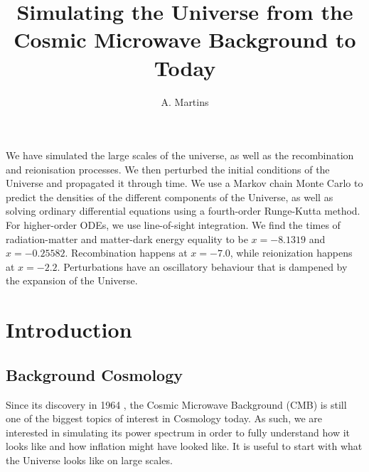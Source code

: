\documentclass{aa}
\begin{document}
 


   \title{Simulating the Universe from the Cosmic Microwave Background to Today}

   \subtitle{}

   \author{A. Martins
          }


   \date{}

 
  \abstract
   {}
   {We have simulated the large scales of the universe, as well as the recombination and reionisation processes. We then perturbed the initial conditions of the Universe and propagated it through time.}
   {We use a Markov chain Monte Carlo to predict the densities of the different components of the Universe, as well as solving ordinary differential equations using a fourth-order Runge-Kutta method. For higher-order ODEs, we use line-of-sight integration.}
   {We find the times of radiation-matter and matter-dark energy equality to be $x=-8.1319$ and $x=-0.25582$. Recombination happens at $x=-7.0$, while reionization happens at $x=-2.2$. Perturbations have an oscillatory behaviour that is dampened by the expansion of the Universe.}
   {}


   \maketitle
%

\section{Introduction}

\subsection{Background Cosmology}
Since its discovery in 1964 \citep{1965ApJ...142..419P, 1965ApJ...142..414D}, the Cosmic Microwave Background (CMB) is still one of the biggest topics of interest in Cosmology today.
As such, we are interested in simulating its power spectrum in order to fully understand how it looks like and how inflation might have looked like. It is useful to start with what the Universe looks like on large scales.
\end{document}
